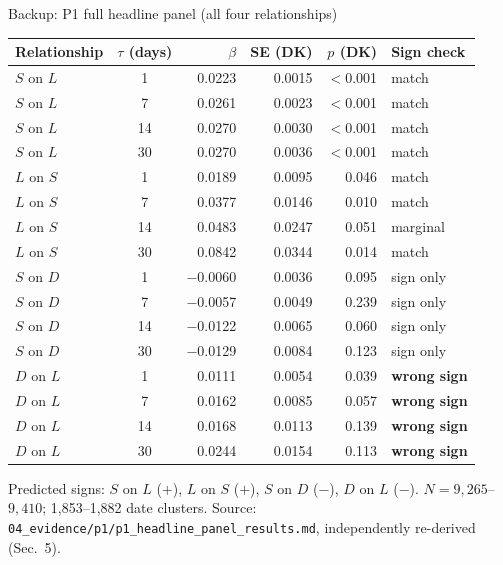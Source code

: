 \documentclass[aspectratio=169]{beamer}
\begin{document}
\begin{frame}{Backup: P1 full headline panel (all four relationships)}
  \tiny
  \begin{center}
  \begin{tabular}{@{}l c r r r l@{}}
    \toprule
    Relationship & $\tau$ (days) & $\beta$ & SE (DK) & $p$ (DK) & Sign check \\
    \midrule
    $S$ on $L$ & 1  & 0.0223  & 0.0015 & $<$0.001 & match \\
    $S$ on $L$ & 7  & 0.0261  & 0.0023 & $<$0.001 & match \\
    $S$ on $L$ & 14 & 0.0270  & 0.0030 & $<$0.001 & match \\
    $S$ on $L$ & 30 & 0.0270  & 0.0036 & $<$0.001 & match \\
    \midrule
    $L$ on $S$ & 1  & 0.0189  & 0.0095 & 0.046 & match \\
    $L$ on $S$ & 7  & 0.0377  & 0.0146 & 0.010 & match \\
    $L$ on $S$ & 14 & 0.0483  & 0.0247 & 0.051 & marginal \\
    $L$ on $S$ & 30 & 0.0842  & 0.0344 & 0.014 & match \\
    \midrule
    $S$ on $D$ & 1  & $-$0.0060 & 0.0036 & 0.095 & sign only \\
    $S$ on $D$ & 7  & $-$0.0057 & 0.0049 & 0.239 & sign only \\
    $S$ on $D$ & 14 & $-$0.0122 & 0.0065 & 0.060 & sign only \\
    $S$ on $D$ & 30 & $-$0.0129 & 0.0084 & 0.123 & sign only \\
    \midrule
    $D$ on $L$ & 1  & 0.0111  & 0.0054 & 0.039 & \textbf{wrong sign} \\
    $D$ on $L$ & 7  & 0.0162  & 0.0085 & 0.057 & \textbf{wrong sign} \\
    $D$ on $L$ & 14 & 0.0168  & 0.0113 & 0.139 & \textbf{wrong sign} \\
    $D$ on $L$ & 30 & 0.0244  & 0.0154 & 0.113 & \textbf{wrong sign} \\
    \bottomrule
  \end{tabular}
  \end{center}
  \vspace{0.4em}
  \tiny Predicted signs: $S$ on $L$ ($+$), $L$ on $S$ ($+$), $S$ on $D$ ($-$), $D$ on $L$ ($-$). $N=9{,}265$--$9{,}410$; 1{,}853--1{,}882 date clusters. Source: \texttt{04\_evidence/p1/p1\_headline\_panel\_results.md}, independently re-derived (Sec.\ 5).
\end{frame}
\end{document}
